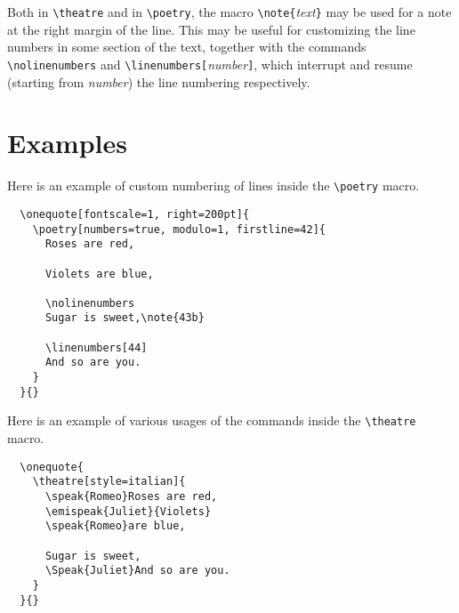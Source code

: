 \documentclass[11pt,a4paper]{article}
\begin{document}
	Both in \verb|\theatre| and in \verb|\poetry|, the macro \verb|\note{|\emph{text}\verb|}| may be used for a note at the right margin of the line. This may be useful for customizing the line numbers in some section of the text, together with the commands \verb|\nolinenumbers| and \verb|\linenumbers[|\emph{number}\verb|]|, which interrupt and resume (starting from \emph{number}) the line numbering respectively.
	
	\newpage
  
  \section{Examples} \label{examples}
	
	Here is an example of custom numbering of lines inside the \verb|\poetry| macro.	
	
	\begin{verbatim}
  \onequote[fontscale=1, right=200pt]{
    \poetry[numbers=true, modulo=1, firstline=42]{
      Roses are red,
      
      Violets are blue,
      
      \nolinenumbers
      Sugar is sweet,\note{43b}
      
      \linenumbers[44]
      And so are you.
    }
  }{}
	\end{verbatim}
	
  
  \bigskip
  
  Here is an example of various usages of the commands inside the \verb|\theatre| macro.
  
  \begin{verbatim}
  \onequote{
    \theatre[style=italian]{
      \speak{Romeo}Roses are red,
      \emispeak{Juliet}{Violets}
      \speak{Romeo}are blue,
      
      Sugar is sweet,
      \Speak{Juliet}And so are you.
    }
  }{}
  \end{verbatim}
  
	
	
\end{document}
